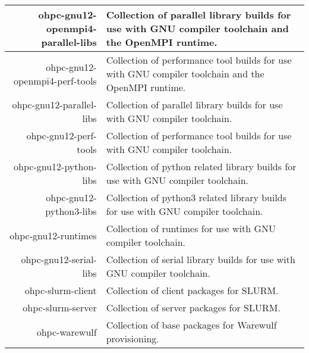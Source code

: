 \begin{tabularx}{\textwidth}{r|X}
\hline
ohpc-gnu12-openmpi4-parallel-libs & Collection of parallel library builds for use with GNU compiler toolchain and the OpenMPI runtime. \\
\hline
ohpc-gnu12-openmpi4-perf-tools & Collection of performance tool builds for use with GNU compiler toolchain and the OpenMPI runtime. \\
\hline
ohpc-gnu12-parallel-libs & Collection of parallel library builds for use with GNU compiler toolchain. \\
\hline
ohpc-gnu12-perf-tools & Collection of performance tool builds for use with GNU compiler toolchain. \\
\hline
ohpc-gnu12-python-libs & Collection of python related library builds for use with GNU compiler toolchain. \\
\hline
ohpc-gnu12-python3-libs & Collection of python3 related library builds for use with GNU compiler toolchain. \\
\hline
ohpc-gnu12-runtimes & Collection of runtimes for use with GNU compiler toolchain. \\
\hline
ohpc-gnu12-serial-libs & Collection of serial library builds for use with GNU compiler toolchain. \\
\hline
ohpc-slurm-client & Collection of client packages for SLURM. \\
\hline
ohpc-slurm-server & Collection of server packages for SLURM. \\
\hline
ohpc-warewulf & Collection of base packages for Warewulf provisioning. \\
\hline
\bottomrule
\end{tabularx}
